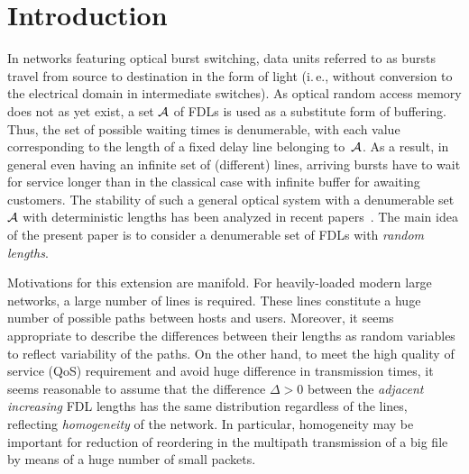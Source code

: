 



      \thispagestyle{myheadings}

      \begin{multicols}{2}

            \label{st\stat}

\section{Introduction}

\noindent
In networks featuring optical burst switching, data units {referred
to as bursts} travel from source to destination in the form of light
(i.\,e., without conversion to the electrical domain in intermediate
switches). As optical random access memory does not as yet exist, a
set $\cal A$ of FDLs is used as a substitute
form of buffering. Thus, the set of possible waiting times is
denumerable, with each value corresponding to the length of a
fixed delay line belonging to~$\cal A$. As a result, in general even
having an infinite set of (different) lines, arriving bursts have to
wait for service longer than in the classical case with infinite
buffer for awaiting customers. The stability of such a general
optical system with  a denumerable set~$\cal A$ with deterministic
lengths has been analyzed in recent papers~\cite{optical1, optical2}. 
The main idea of the present paper is to consider a
denumerable set of FDLs
 with {\it random lengths}.

Motivations for this extension are manifold. For heavily-loaded
modern large networks, a large number of lines is required.
These lines constitute a huge number of possible paths between hosts
and  users. Moreover, it seems appropriate to describe the
differences between their lengths as random variables to reflect 
variability of the paths. On the other hand,  to meet the high
quality of service (QoS) requirement and avoid  huge  difference in transmission times,
it seems reasonable to assume that the difference $\Delta>0$ between
the {\it adjacent increasing} FDL lengths has the same distribution
regardless of the lines, reflecting  {\it homogeneity} of the
network.
 In particular, homogeneity may be important for  reduction
of reordering in the multipath transmission of a big file by
means of a huge number of  small packets. 


\end{multicols}
